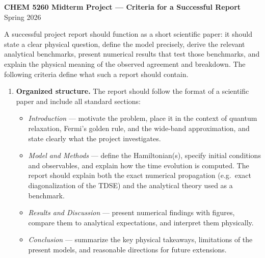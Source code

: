 \documentclass[12pt,letterpaper]{article}
\begin{document}
\begin{center}
  {\large\bfseries CHEM 5260 Midterm Project --- Criteria for a Successful Report}\\[0.5em]
  {\normalsize Spring 2026}
\end{center}

\bigskip

A successful project report should function as a short scientific paper: it
should state a clear physical question, define the model precisely, derive
the relevant analytical benchmarks, present numerical results that test those
benchmarks, and explain the physical meaning of the observed agreement and
breakdown.  The following criteria define what such a report should contain.

\begin{enumerate}

\item \textbf{Organized structure.}
  The report should follow the format of a scientific paper and include all
  standard sections:
  \begin{itemize}
    \item \textit{Introduction} --- motivate the problem, place it in the
          context of quantum relaxation, Fermi's golden rule, and the
          wide-band approximation, and state clearly what the project
          investigates.
    \item \textit{Model and Methods} --- define the Hamiltonian(s), specify
          initial conditions and observables, and explain how the time
          evolution is computed.  The report should explain both the exact
          numerical propagation (e.g.\ exact diagonalization of the TDSE) and
          the analytical theory used as a benchmark.
    \item \textit{Results and Discussion} --- present numerical findings with
          figures, compare them to analytical expectations, and interpret
          them physically.
    \item \textit{Conclusion} --- summarize the key physical takeaways,
          limitations of the present models, and reasonable directions for
          future extensions.
  \end{itemize}


\end{enumerate}
\end{document}
